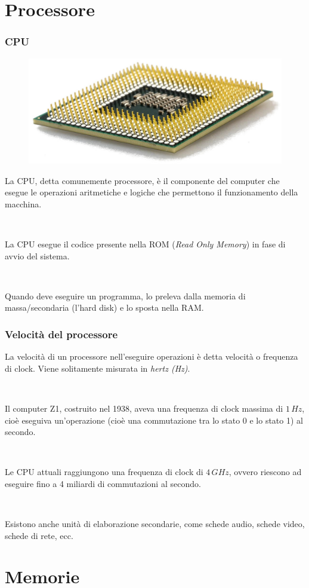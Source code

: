 \documentclass[]{beamer}
\begin{document}
\section{Processore}


\begin{frame}
\frametitle{CPU}
\begin{figure}
  \includegraphics[width=.4\columnwidth]{img/cpu.jpg}
\end{figure}
La CPU, detta comunemente \alert<1>{processore}, è il componente del computer che esegue le operazioni aritmetiche e logiche che permettono il funzionamento della macchina.\pause

~

La CPU esegue il codice presente nella ROM (\emph{Read Only Memory}) in fase di avvio del sistema.\pause

~

Quando deve eseguire un programma, lo preleva dalla memoria di massa/secondaria (l'hard disk) e lo sposta nella RAM.
\end{frame}


\begin{frame}
\frametitle{Velocità del processore}
La velocità di un processore nell'eseguire operazioni è detta \alert<1>{velocità o frequenza di clock}. Viene solitamente misurata in \emph{hertz (Hz)}.\pause

~

Il computer Z1, costruito nel 1938, aveva una frequenza di clock massima di $ 1 \, Hz $, cioè eseguiva un'operazione (cioè una commutazione tra lo stato 0 e lo stato 1) al secondo.\pause

~

Le CPU attuali raggiungono una frequenza di clock di $ 4 \, GHz $, ovvero riescono ad eseguire fino a \alert<3>{4 miliardi di commutazioni al secondo}.\pause

~

Esistono anche \alert<4>{unità di elaborazione secondarie}, come schede audio, schede video, schede di rete, ecc.
\end{frame}

\section{Memorie}
\end{document}
